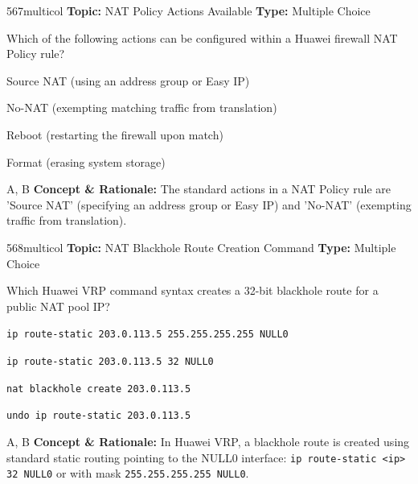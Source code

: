 \begin{qcard}{567}{multicol}
\textcolor{darkslate!75}{\small\textbf{Topic:} NAT Policy Actions Available \hfill \textbf{Type:} Multiple Choice}\vspace{0.4em}\par
Which of the following actions can be configured within a Huawei firewall NAT Policy rule?
\begin{qoptions}
\item Source NAT (using an address group or Easy IP)
\item No-NAT (exempting matching traffic from translation)
\item Reboot (restarting the firewall upon match)
\item Format (erasing system storage)
\end{qoptions}
\end{qcard}
\nopagebreak
\begin{explainbox}{A, B}
\textbf{Concept \& Rationale:} The standard actions in a NAT Policy rule are 'Source NAT' (specifying an address group or Easy IP) and 'No-NAT' (exempting traffic from translation).
\end{explainbox}

\begin{qcard}{568}{multicol}
\textcolor{darkslate!75}{\small\textbf{Topic:} NAT Blackhole Route Creation Command \hfill \textbf{Type:} Multiple Choice}\vspace{0.4em}\par
Which Huawei VRP command syntax creates a 32-bit blackhole route for a public NAT pool IP?
\begin{qoptions}
\item \texttt{ip route-static 203.0.113.5 255.255.255.255 NULL0}
\item \texttt{ip route-static 203.0.113.5 32 NULL0}
\item \texttt{nat blackhole create 203.0.113.5}
\item \texttt{undo ip route-static 203.0.113.5}
\end{qoptions}
\end{qcard}
\nopagebreak
\begin{explainbox}{A, B}
\textbf{Concept \& Rationale:} In Huawei VRP, a blackhole route is created using standard static routing pointing to the NULL0 interface: \texttt{ip route-static \textless{}ip\textgreater{} 32 NULL0} or with mask \texttt{255.255.255.255 NULL0}.
\end{explainbox}

